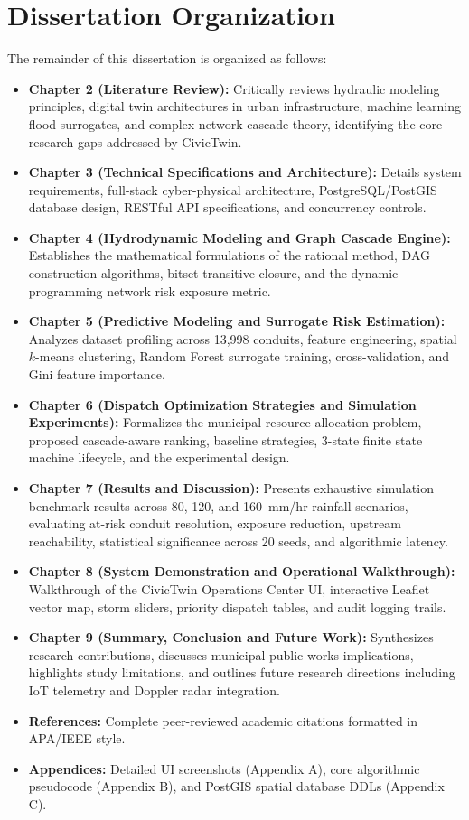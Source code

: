 \section{Dissertation Organization}
The remainder of this dissertation is organized as follows:
\begin{itemize}
    \item \textbf{Chapter 2 (Literature Review):} Critically reviews hydraulic modeling principles, digital twin architectures in urban infrastructure, machine learning flood surrogates, and complex network cascade theory, identifying the core research gaps addressed by CivicTwin.
    \item \textbf{Chapter 3 (Technical Specifications and Architecture):} Details system requirements, full-stack cyber-physical architecture, PostgreSQL/PostGIS database design, RESTful API specifications, and concurrency controls.
    \item \textbf{Chapter 4 (Hydrodynamic Modeling and Graph Cascade Engine):} Establishes the mathematical formulations of the rational method, DAG construction algorithms, bitset transitive closure, and the dynamic programming network risk exposure metric.
    \item \textbf{Chapter 5 (Predictive Modeling and Surrogate Risk Estimation):} Analyzes dataset profiling across 13,998 conduits, feature engineering, spatial $k$-means clustering, Random Forest surrogate training, cross-validation, and Gini feature importance.
    \item \textbf{Chapter 6 (Dispatch Optimization Strategies and Simulation Experiments):} Formalizes the municipal resource allocation problem, proposed cascade-aware ranking, baseline strategies, 3-state finite state machine lifecycle, and the experimental design.
    \item \textbf{Chapter 7 (Results and Discussion):} Presents exhaustive simulation benchmark results across 80, 120, and 160~mm/hr rainfall scenarios, evaluating at-risk conduit resolution, exposure reduction, upstream reachability, statistical significance across 20 seeds, and algorithmic latency.
    \item \textbf{Chapter 8 (System Demonstration and Operational Walkthrough):} Walkthrough of the CivicTwin Operations Center UI, interactive Leaflet vector map, storm sliders, priority dispatch tables, and audit logging trails.
    \item \textbf{Chapter 9 (Summary, Conclusion and Future Work):} Synthesizes research contributions, discusses municipal public works implications, highlights study limitations, and outlines future research directions including IoT telemetry and Doppler radar integration.
    \item \textbf{References:} Complete peer-reviewed academic citations formatted in APA/IEEE style.
    \item \textbf{Appendices:} Detailed UI screenshots (Appendix A), core algorithmic pseudocode (Appendix B), and PostGIS spatial database DDLs (Appendix C).
\end{itemize}
